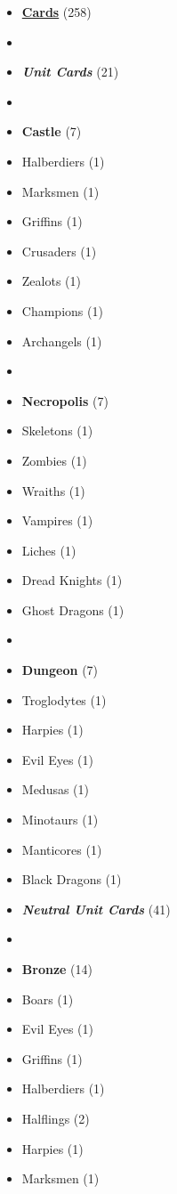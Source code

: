 \begin{multicols*}{3}
\begin{itemize}[leftmargin=0pt, label={}, noitemsep]
  \item \textbf{\small{\underline{Cards}}} (258)
  \item
  \item \textbf{\emph{Unit Cards}} (21)
  \item
  \item \textbf{Castle} (7)
  \item Halberdiers (1)
  \item Marksmen (1)
  \item Griffins (1)
  \item Crusaders (1)
  \item Zealots (1)
  \item Champions (1)
  \item Archangels (1)
  \item
  \item \textbf{Necropolis} (7)
  \item Skeletons (1)
  \item Zombies (1)
  \item Wraiths (1)
  \item Vampires (1)
  \item Liches (1)
  \item Dread Knights (1)
  \item Ghost Dragons (1)
  \item
  \item \textbf{Dungeon} (7)
  \item Troglodytes (1)
  \item Harpies (1)
  \item Evil Eyes (1)
  \item Medusas (1)
  \item Minotaurs (1)
  \item Manticores (1)
  \item Black Dragons (1)
\columnbreak
  \item \textbf{\emph{Neutral Unit Cards}} (41)
  \item
  \item \textbf{Bronze} (14)
  \item Boars (1)
  \item Evil Eyes (1)
  \item Griffins (1)
  \item Halberdiers (1)
  \item Halflings (2)
  \item Harpies (1)
  \item Marksmen (1)

\end{itemize}
\end{multicols*}

